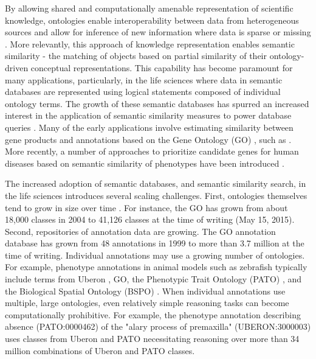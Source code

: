 \documentclass{article}
\begin{document}
By \cite{wu2013improving} allowing shared and computationally amenable representation of scientific knowledge, ontologies enable interoperability between data from heterogeneous sources \cite{uschold1996ontologies, blake2004bio} and allow for inference of new information where data is sparse or missing \cite{dececchi2015toward,maetschke2012gene}. More relevantly, this approach of knowledge representation enables semantic similarity - the matching of objects based on partial similarity of their ontology-driven conceptual representations. This capability has become paramount for many applications, particularly, in the life sciences where data in semantic databases are represented using logical statements composed of individual ontology terms. The growth of these semantic databases has spurred an increased interest in the application of semantic similarity measures to power database queries \cite{pesquita2009semantic, harispe2014semantic}. Many of the early applications involve estimating similarity between gene products and annotations based on the Gene Ontology (GO) \cite{gene2015gene}, such as \cite{mistry2008gene, couto2007measuring, couto2003implementation,yu2010gosemsim, du2009g, wu2013improving}.  More recently, a number of approaches to prioritize candidate genes for human diseases based on semantic similarity of phenotypes have been introduced \cite{oellrich2012improving, washington2009linking, chen2007improved}. 

The increased adoption of semantic databases, and semantic similarity search, in the life sciences introduces several scaling challenges. First, ontologies themselves tend to grow in size over time \cite{yang2006evaluation}. For instance, the GO has grown from about 18,000 classes in 2004 to 41,126 classes at the time of writing (May 15, 2015). Second, repositories of annotation data are growing. The GO annotation database \cite{?} has grown from 48 annotations in 1999 to more than 3.7 million at the time of writing. Individual annotations may use a growing number of ontologies. For example, phenotype annotations in animal models such as zebrafish typically include terms from Uberon \cite{haendel2014unification}, GO, the Phenotypic Trait Ontology (PATO) \cite{gkoutos2004using}, and the Biological Spatial Ontology (BSPO) \cite{dahdul2014nose}. When individual annotations use multiple, large ontologies, even relatively simple reasoning tasks can become computationally prohibitive. For example, the phenotype annotation describing absence (PATO:0000462) of the "alary process of premaxilla" (UBERON:3000003) uses classes from Uberon and PATO necessitating reasoning over more than 34 million combinations of Uberon and PATO classes. 
\end{document}
